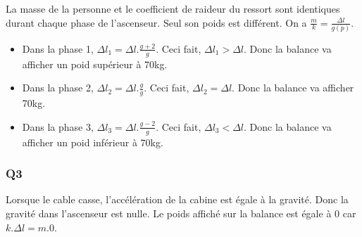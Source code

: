\documentclass[]{book}
\theoremstyle{definition}
\begin{document}
La masse de la personne et le coefficient de raideur du ressort sont identiques durant chaque phase de l'ascenseur. Seul son poids est diff\'erent. On a $\frac{m}{k} = \frac{\Delta l}{g(p)}$. 

\begin{itemize}
\item Dans la phase 1, $\Delta l_1 = \Delta l.\frac{g+2}{g}$. Ceci fait, $\Delta l_1 > \Delta l$. Donc la balance va afficher un poid sup\'erieur \`a 70kg.
\item Dans la phase 2, $\Delta l_2 = \Delta l.\frac{g}{g}$. Ceci fait, $\Delta l_2 = \Delta l$. Donc la balance va afficher 70kg.
\item Dans la phase 3, $\Delta l_3 = \Delta l.\frac{g-2}{g}$. Ceci fait, $\Delta l_3 < \Delta l$. Donc la balance va afficher un poid inf\'erieur \`a 70kg.
\end{itemize}

\subsubsection*{Q3}
Lorsque le cable casse, l'acc\'el\'eration de la cabine est \'egale \`a la gravit\'e. Donc la gravit\'e dans l'ascenseur est nulle. Le poids affich\'e sur la balance est \'egale \`a $0$ car $k.\Delta l = m.0$.
\end{document}
